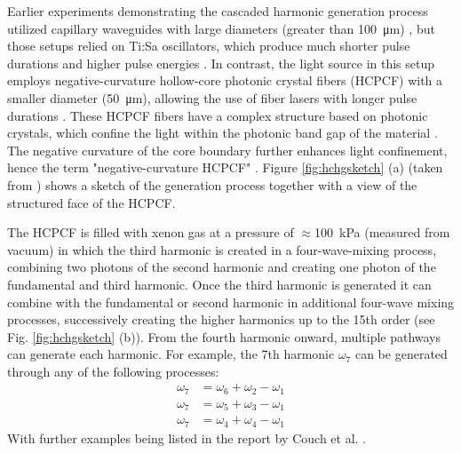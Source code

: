 Earlier experiments demonstrating the cascaded harmonic generation process utilized capillary waveguides with large diameters (greater than \qty{100}{\micro\meter}) \cite{misoguti_generation_2001}, but those setups relied on Ti:Sa oscillators, which produce much shorter pulse durations and higher pulse energies \cite{misoguti_generation_2001,durfee_phase_2002,misoguti_nonlinear_2005}.
In contrast, the light source in this setup employs negative-curvature hollow-core photonic crystal fibers (HCPCF) with a smaller diameter (\qty{50}{\micro\meter}), allowing the use of fiber lasers with longer pulse durations \cite{couch_ultrafast_2020}.
These HCPCF fibers have a complex structure based on photonic crystals, which confine the light within the photonic band gap of the material \cite{kolyadin_negative_2015, wei_negative_2017}.
The negative curvature of the core boundary further enhances light confinement, hence the term "negative-curvature HCPCF" \cite{wei_negative_2017}.
Figure \ref{fig:hchgsketch} (a) (taken from \cite{couch_ultrafast_2020}) shows a sketch of the generation process together with a view of the structured face of the HCPCF.

The HCPCF is filled with xenon gas at a pressure of $\approx$\qty{100}{\kilo\pascal} (measured from vacuum) in which the third harmonic is created in a four-wave-mixing process, combining two photons of the second harmonic and creating one photon of the fundamental and third harmonic.
Once the third harmonic is generated it can combine with the fundamental or second harmonic in additional four-wave mixing processes, successively creating the higher harmonics up to the 15th order (see Fig. \ref{fig:hchgsketch} (b)).
From the fourth harmonic onward, multiple pathways can generate each harmonic.
For example, the 7th harmonic $\omega_7$ can be generated through any of the following processes:
\begin{equation}
\begin{aligned}
	\omega_7 &= \omega_6 + \omega_2 - \omega_1 \\
	\omega_7 &= \omega_5 + \omega_3 - \omega_1 \\
	\omega_7 &= \omega_4 + \omega_4 - \omega_1
\end{aligned}
\label{eq:vuv_pathway}
\end{equation}
With further examples being listed in the report by Couch et al. \cite{couch_ultrafast_2020}.

